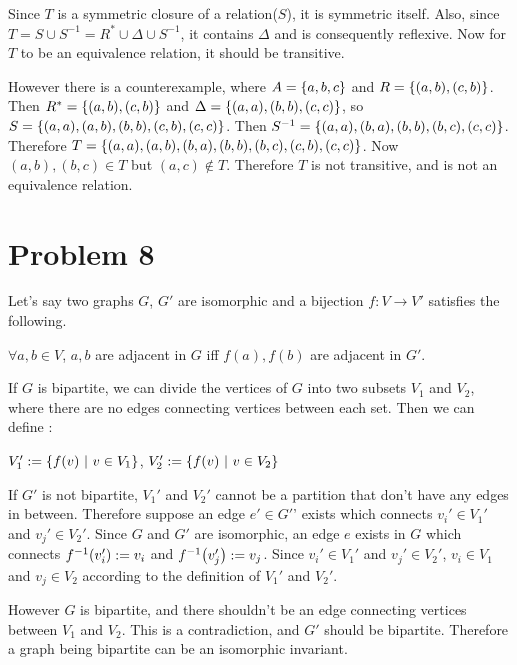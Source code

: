 \documentclass[10pt]{article}
\begin{document}
\vspace{3mm}
Since $T$ is a symmetric closure of a relation($S$), it is symmetric itself.
Also, since $T = S \cup S^{-1} = R^* \cup \Delta \cup S^{-1}$, it contains $\Delta$ and is consequently reflexive.
Now for $T$ to be an equivalence relation, it should be transitive.

\vspace{3mm}
However there is a counterexample, where $A = \qty{a, b ,c}$ and $R = \qty{(a, b), (c, b)}$.
Then $R^* = \qty{(a, b), (c, b)}$ and $\Delta = \qty{(a, a), (b, b), (c, c)}$, so $S = \qty{(a, a), (a, b), (b, b), (c, b), (c, c)}$.
Then $S^{-1} = \qty{(a, a), (b, a), (b, b), (b, c), (c, c)}$.
Therefore $T = \qty{(a, a), (a, b), (b, a), (b, b), (b, c), (c, b), (c, c)}$.
Now $(a, b), (b, c) \in T$ but $(a, c) \notin T$. Therefore $T$ is not transitive, and is not an equivalence relation.

\section*{Problem 8}
Let's say two graphs $G$, $G'$ are isomorphic and a bijection $f \colon V \rightarrow V'$ satisfies the following.
\begin{center}
    $\forall a, b \in V$, $a, b$ are adjacent in $G$ iff $f(a), f(b)$ are adjacent in $G'$.
\end{center}
If $G$ is bipartite, we can divide the vertices of $G$ into two subsets $V_1$ and $V_2$, where there are no edges connecting vertices between each set.
Then we can define :
\begin{center}
    $V_1' := \qty{f(v) ~|~ v \in V_1}$, $V_2' := \qty{f(v) ~|~ v \in V_2}$
\end{center}
If $G'$ is not bipartite, $V_1'$ and $V_2'$ cannot be a partition that don't have any edges in between. 
Therefore suppose an edge $e' \in G'$' exists which connects $v_i' \in V_1'$ and $v_j' \in V_2'$.
Since $G$ and $G'$ are isomorphic, an edge $e$ exists in $G$ which connects $f^{-1}\qty(v_i') := v_i$ and $f^{-1}\qty(v_j') := v_j$. 
Since $v_i' \in V_1'$ and $v_j' \in V_2'$, $v_i \in V_1$ and $v_j \in V_2$ according to the definition of $V_1'$ and $V_2'$.

\vspace{3mm}
However $G$ is bipartite, and there shouldn't be an edge connecting vertices between $V_1$ and $V_2$. 
This is a contradiction, and $G'$ should be bipartite. 
Therefore a graph being bipartite can be an isomorphic invariant.
\end{document}
